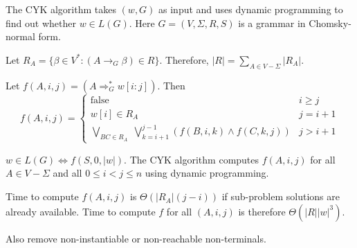 The CYK algorithm takes $(w, G)$ as input and uses dynamic programming to find out whether $w \in L(G)$.
Here $G = (V, \Sigma, R, S)$ is a grammar in Chomsky-normal form.

Let $R_A = \{\beta \in V^*: (A \rightarrow_G \beta) \in R\}$.
Therefore, $|R| = \sum_{A \in V-\Sigma} |R_A|$.

Let $f(A, i, j) = (A \Rightarrow_G^* w[i:j])$. Then
\[ f(A, i, j) = \left\{\begin{array}{cl}
\textrm{false} & i \ge j
\\ w[i] \in R_A & j = i+1
\\ \displaystyle \bigvee\limits_{BC \in R_A} \; \bigvee\limits_{k=i+1}^{j-1}
    (f(B, i, k) \wedge f(C, k, j)) & j > i+1
\end{array}\right. \]

$w \in L(G) \iff f(S, 0, |w|)$.
The CYK algorithm computes $f(A, i, j)$ for all $A \in V-\Sigma$
and all $0 \le i < j \le n$ using dynamic programming.

Time to compute $f(A, i, j)$ is $\Theta(|R_A|(j-i))$
if sub-problem solutions are already available.
Time to compute $f$ for all $(A, i, j)$ is therefore $\Theta(|R||w|^3)$.



Also remove non-instantiable or non-reachable non-terminals.
